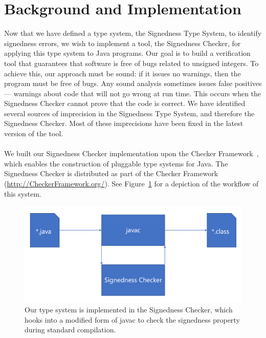 \newpage
\section{Background and Implementation} \label{imp}

Now that we have defined a type system, the Signedness Type System, to identify
signedness errors, we wish to implement a tool, the Signedness Checker,
for applying this type system
to Java programs.
Our goal is to build a verification tool that guarantees that software is
free of bugs related to unsigned integers. To achieve this, our approach
must be sound:  if it issues no warnings, then the program must be free of
bugs.
Any sound analysis sometimes issues false positives --- warnings about
code that will not go wrong at run time.  This occurs when the
Signedness Checker cannot prove that the code is correct. We have identified
several sources of imprecision in the Signedness Type System, and therefore the
Signedness Checker. Most of these imprecisions have been fixed in the latest
version of the tool.\\
\\
We built our Signedness Checker implementation upon the
Checker Framework~\cite{PapiACPE2008,DietlDEMS2011}, which enables the
construction of pluggable type systems for Java.
The Signedness Checker is distributed as part of the Checker Framework
(\url{http://CheckerFramework.org/}). See Figure~\ref{fig:system} for a
depiction of the workflow of this system.

\begin{figure}
\centering
\includegraphics[scale=0.6]{signedness-system}
\caption{Our type system is implemented in the Signedness Checker, which
hooks into a modified form of javac to check the signedness property during
standard compilation.}
\label{fig:system}
\end{figure}


